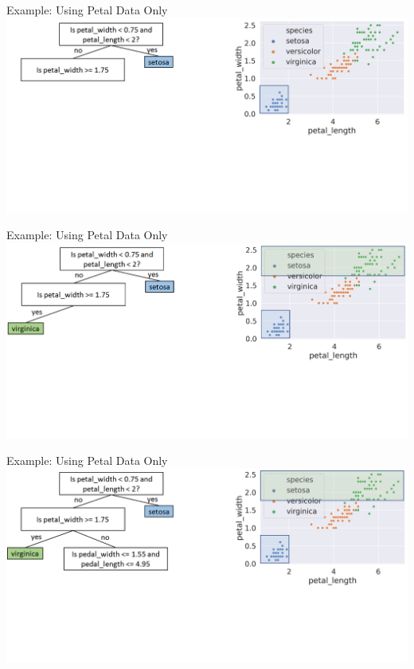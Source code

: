 \documentclass[aspectratio=169]{../latex_main/tntbeamer}  %
\begin{document}
	
	\begin{frame}{Example: Using Petal Data Only}
	        \includegraphics[scale=.34]{figure_tree/Bild8}
	\end{frame}
	
	
	\begin{frame}{Example: Using Petal Data Only}
	        \includegraphics[scale=.34]{figure_tree/Bild9}
	\end{frame}
	
	
	\begin{frame}{Example: Using Petal Data Only}
	        \includegraphics[scale=.34]{figure_tree/Bild10}
	\end{frame}
	
\end{document}
